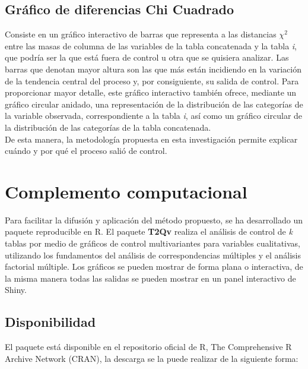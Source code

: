 \documentclass[mathematics,article,submit,moreauthors,pdftex]{mdpi}
\begin{document}
\hypertarget{gruxe1fico-de-diferencias-chi-cuadrado}{%
\subsection{Gráfico de diferencias Chi
Cuadrado}\label{gruxe1fico-de-diferencias-chi-cuadrado}}

Consiste en un gráfico interactivo de barras que representa a las
distancias \(\chi^2\) entre las masas de columna de las variables de la
tabla concatenada y la tabla \emph{i}, que podría ser la que está fuera
de control u otra que se quisiera analizar. Las barras que denotan mayor
altura son las que más están incidiendo en la variación de la tendencia
central del proceso y, por consiguiente, su salida de control. Para
proporcionar mayor detalle, este gráfico interactivo también ofrece,
mediante un gráfico circular anidado, una representación de la
distribución de las categorías de la variable observada, correspondiente
a la tabla \emph{i}, así como un gráfico circular de la distribución de
las categorías de la tabla concatenada.\\
De esta manera, la metodología propuesta en esta investigación permite
explicar cuándo y por qué el proceso salió de control.

\hypertarget{complemento-computacional}{%
\section{Complemento computacional}\label{complemento-computacional}}

Para facilitar la difusión y aplicación del método propuesto, se ha
desarrollado un paquete reproducible en R. El paquete \textbf{T2Qv}
\citep{T2Qv} realiza el análisis de control de \emph{k} tablas por medio
de gráficos de control multivariantes para variables cualitativas,
utilizando los fundamentos del análisis de correspondencias múltiples y
el análisis factorial múltiple. Los gráficos se pueden mostrar de forma
plana o interactiva, de la misma manera todas las salidas se pueden
mostrar en un panel interactivo de Shiny.

\hypertarget{disponibilidad}{%
\subsection{Disponibilidad}\label{disponibilidad}}

El paquete está disponible en el repositorio oficial de R, The
Comprehensive R Archive Network (CRAN), la descarga se la puede realizar
de la siguiente forma:
\end{document}
